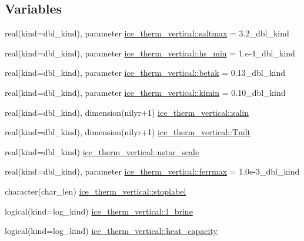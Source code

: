 \subsection*{Variables}
\begin{DoxyCompactItemize}
\item 
real(kind=dbl\_\-kind), parameter \hyperlink{namespaceice__therm__vertical_abca199468a09d7af2a96e7ceb456b8c4}{ice\_\-therm\_\-vertical::saltmax} = 3.2\_\-dbl\_\-kind
\item 
real(kind=dbl\_\-kind), parameter \hyperlink{namespaceice__therm__vertical_af7421836575fc4323bfe4b53fbc5f1ac}{ice\_\-therm\_\-vertical::hs\_\-min} = 1.e-\/4\_\-dbl\_\-kind
\item 
real(kind=dbl\_\-kind), parameter \hyperlink{namespaceice__therm__vertical_a5d1e969b838504de79a78a45daba6424}{ice\_\-therm\_\-vertical::betak} = 0.13\_\-dbl\_\-kind
\item 
real(kind=dbl\_\-kind), parameter \hyperlink{namespaceice__therm__vertical_ac9c4fb671c6d11d24a29369d6c7410fa}{ice\_\-therm\_\-vertical::kimin} = 0.10\_\-dbl\_\-kind
\item 
real(kind=dbl\_\-kind), dimension(nilyr+1) \hyperlink{namespaceice__therm__vertical_a484442c434b314140ae3763d41fc9075}{ice\_\-therm\_\-vertical::salin}
\item 
real(kind=dbl\_\-kind), dimension(nilyr+1) \hyperlink{namespaceice__therm__vertical_a25807d5de9fde0e10364d63e32691919}{ice\_\-therm\_\-vertical::Tmlt}
\item 
real(kind=dbl\_\-kind) \hyperlink{namespaceice__therm__vertical_a95faafaf9b21d14aa8dcf5fd91e50cac}{ice\_\-therm\_\-vertical::ustar\_\-scale}
\item 
real(kind=dbl\_\-kind), parameter \hyperlink{namespaceice__therm__vertical_a0721a294c629506af790049e6d607d53}{ice\_\-therm\_\-vertical::ferrmax} = 1.0e-\/3\_\-dbl\_\-kind
\item 
character(char\_\-len) \hyperlink{namespaceice__therm__vertical_a11814e124127a01f102f5b38e9ede650}{ice\_\-therm\_\-vertical::stoplabel}
\item 
logical(kind=log\_\-kind) \hyperlink{namespaceice__therm__vertical_aeb4df87d7011ce33c626c76f6a0dc063}{ice\_\-therm\_\-vertical::l\_\-brine}
\item 
logical(kind=log\_\-kind) \hyperlink{namespaceice__therm__vertical_a533694de6308b9a0b8839ba5dacc54af}{ice\_\-therm\_\-vertical::heat\_\-capacity}
\end{DoxyCompactItemize}
